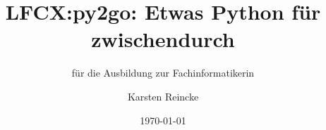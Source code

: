 \documentclass[]{beamer}
\title{LFCX:py2go: Etwas Python für zwischendurch}
\subtitle{für die Ausbildung zur Fachinformatikerin}
\institute{GS-LDK}
\author{Karsten Reincke}
\date{\today}
\def\cfgGl{../../../cfg.gl/}
\begin{document}

\begin{frame}
  \titlepage
\end{frame}






\logo{}
\newpage



%
\end{document}
